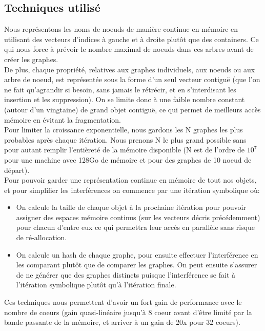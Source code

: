 \documentclass[11pts,french]{article}
\begin{document}
\subsection{ Techniques utilisé }

Nous représentons les noms de noeuds de manière continue en mémoire en utilisant des vecteurs d'indices à gauche et à droite plutôt que des containers. Ce qui nous force à prévoir le nombre maximal de noeuds dans ces arbres avant de créer les graphes.  \\

De plus, chaque propriété, relatives aux graphes individuels, aux noeuds ou aux arbre de noeud, est représentée sous la forme d'un seul vecteur contiguë (que l'on ne fait qu'agrandir si besoin, sans jamais le rétrécir, et en s'interdisant les insertion et les suppression). On se limite donc à une faible nombre constant (autour d'un vingtaine) de grand objet contiguë, ce qui permet de meilleurs accès mémoire en évitant la fragmentation. \\

Pour limiter la croissance exponentielle, nous gardons les N graphes les plus probables après chaque itération. Nous prenons N le plus grand possible sans pour autant remplir l'entièreté de la mémoire disponible (N est de l'ordre de $10^{7}$ pour une machine avec 128Go de mémoire et pour des graphes de 10 noeud de départ). \\

Pour pouvoir garder une représentation continue en mémoire de tout nos objets, et pour simplifier les interférences on commence par une itération symbolique où:

\begin{itemize}
\itemsep0em
    \item On calcule la taille de chaque objet à la prochaine itération pour pouvoir assigner des espaces mémoire continus (sur les vecteurs décris précédemment) pour chacun d'entre eux ce qui permettra leur accès en parallèle sans risque de ré-allocation.
    \item On calcule un hash de chaque graphe, pour ensuite effectuer l'interférence en les comparant plutôt que de comparer les graphes. On peut ensuite s'assurer de ne générer que des graphes distincts puisque l'interférence se fait à l'itération symbolique plutôt qu'à l'itération finale.
\end{itemize}

Ces techniques nous permettent d'avoir un fort gain de performance avec le nombre de coeurs (gain quasi-linéaire jusqu'à 8 coeur avant d'être limité par la bande passante de la mémoire, et arriver à un gain de 20x pour 32 coeurs).
\end{document}

